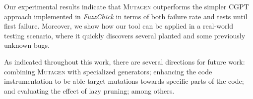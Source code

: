 \documentclass[sigconf,review,anonymous]{acmart}
\newcommand{\fuzzchick}{\textit{FuzzChick}\xspace}
\newcommand{\mutagen}{\textsc{Mutagen}\xspace}
\begin{document}
Our experimental results indicate that \mutagen outperforms the simpler CGPT
approach implemented in \fuzzchick in terms of both failure rate and tests until
first failure.
%
Moreover, we show how our tool can be applied in a real-world testing scenario,
where it quickly discovers several planted and some previously unknown bugs.


As indicated throughout this work, there are several directions for future work:
%
combining \mutagen with specialized generators; enhancing the code
instrumentation to be able target mutations towards specific parts of the code;
and evaluating the effect of lazy pruning; among others.






\balance





\end{document}
